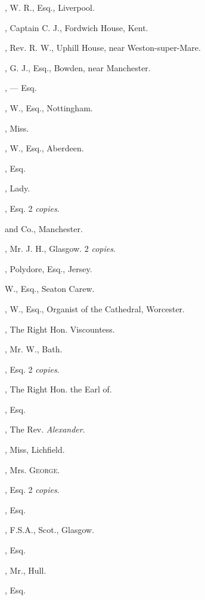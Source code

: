 \begin{multicols}{2}
, W. R., Esq., Liverpool.

, Captain C. J., Fordwich House,
Kent.

, Rev. R. W., Uphill House, near
Weston-super-Mare.
\columnbreak

, G. J., Esq., Bowden, near Manchester.

, — Esq.

, W., Esq., Nottingham.
\bigskip

, Miss.

, W., Esq., Aberdeen.

, Esq.

, Lady.

, Esq. 2 \textit{copies}.

 and Co., Manchester.

, Mr. J. H., Glasgow. 2 \textit{copies}.

, Polydore, Esq., Jersey.

 W., Esq., Seaton Carew.

, W., Esq., Organist of the Cathedral,
Worcester.

, The Right Hon. Viscountess.

, Mr. W., Bath.

, Esq. 2 \textit{copies}.

, The Right Hon. the Earl of.

, Esq.

, The Rev. \textit{Alexander}.
\bigskip

, Miss, Lichfield.

, Mrs. \textsc{George}.

, Esq. 2 \textit{copies}.

, Esq.

, F.S.A., Scot., Glasgow.
\bigskip

, Esq.

, Mr., Hull.

, Esq.


\end{multicols}
